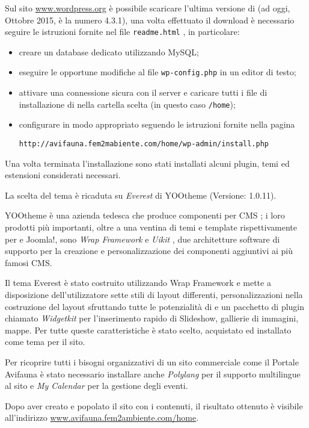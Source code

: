 Sul sito \url{www.wordpress.org} è possibile scaricare l'ultima versione di {\wp} (ad oggi, Ottobre 2015, è la numero 4.3.1), una volta effettuato il download è necessario seguire le istruzioni fornite nel file \texttt{readme.html} \cite{installing_wordpress}, in particolare:
\begin{itemize}
 \item creare un database dedicato utilizzando MySQL;
 \item eseguire le opportune modifiche al file \texttt{wp-config.php} in un editor di testo;
 \item attivare una connessione sicura con il server e caricare tutti i file di installazione di {\wp} nella cartella scelta (in questo caso \texttt{/home});
 \item configurare in modo appropriato seguendo le istruzioni fornite nella pagina

 \texttt{http://avifauna.fem2mabiente.com/home/wp-admin/install.php}
\end{itemize}

Una volta terminata l'installazione sono stati installati alcuni plugin, temi ed estensioni considerati necessari.

La scelta del tema è ricaduta su \emph{Everest} di YOOtheme (Versione: 1.0.11). 

YOOtheme è una azienda tedesca che produce componenti per CMS \cite{yootheme}; i loro prodotti più importanti, oltre a una ventina di temi e template rispettivamente per {\wp} e Joomla!, sono \emph{Wrap Framework} \cite{wrap} e \emph{Uikit} \cite{uikit}, due architetture software di supporto per la creazione e personalizzazione dei componenti aggiuntivi ai più famosi CMS.

Il tema Everest è stato costruito utilizzando Wrap Framework e mette a disposizione dell'utilizzatore sette stili di layout differenti, personalizzazioni nella costruzione del layout sfruttando tutte le potenzialità di {\wp} e un pacchetto di plugin chiamato \emph{Widgetkit} per l'inserimento rapido di Slideshow, gallierie di immagini, mappe. Per tutte queste caratteristiche è stato scelto, acquistato ed installato come tema per il sito.

Per ricoprire tutti i bisogni organizzativi di un sito commerciale come il Portale Avifauna è stato necessario installare anche \emph{Polylang} \cite{polylang} per il supporto multilingue al sito e \emph{My Calendar} \cite{mycalendar} per la gestione degli eventi.

Dopo aver creato e popolato il sito con i contenuti, il risultato ottenuto è visibile all'indirizzo \url{www.avifauna.fem2ambiente.com/home}.
